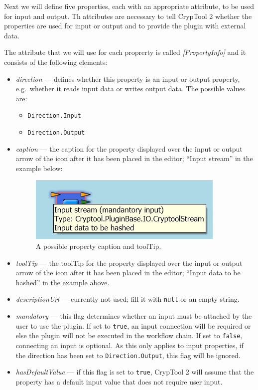Next we will define five properties, each with an appropriate attribute, to be used for input and output. Th attributes are necessary to tell CrypTool 2 whether the properties are used for input or output and to provide the plugin with external data.

The attribute that we will use for each proprerty is called \textit{[PropertyInfo]} and it consists of the following elements:

\begin{itemize}
	\item \textit{direction} --- defines whether this property is an input or output property, e.g.\ whether it reads input data or writes output data. The possible values are:
	\begin{itemize}
		\item \texttt{Direction.Input}
		\item \texttt{Direction.Output}
	\end{itemize}
	\item \textit{caption} --- the caption for the property displayed over the input or output arrow of the icon after it has been placed in the editor; ``Input stream'' in the example below:
	
\begin{figure}[h!]
	\centering
		\includegraphics[width=.55\textwidth]{figures/property_caption.jpg}
	\caption{A possible property caption and toolTip.}
	\label{fig:property_caption}
\end{figure}

	\item \textit{toolTip} --- the toolTip for the property displayed over the input or output arrow of the icon after it has been placed in the editor; ``Input data to be hashed'' in the example above.
	\item \textit{descriptionUrl} --- currently not used; fill it with \texttt{null} or an empty string.
	\item \textit{mandatory} --- this flag determines whether an input must be attached by the user to use the plugin. If set to \texttt{true}, an input connection will be required or else the plugin will not be executed in the workflow chain. If set to \texttt{false}, connecting an input is optional. As this only applies to input properties, if the direction has been set to \texttt{Direction.Output}, this flag will be ignored.
	\item \textit{hasDefaultValue} --- if this flag is set to \texttt{true}, CrypTool 2 will assume that the property has a default input value that does not require user input.
	

\end{itemize}
